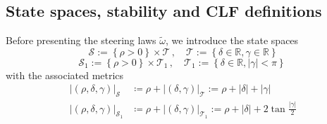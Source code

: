 \documentclass[letterpaper, 10 pt, conference]{ieeeconf}  %
\newcommand{\abs}[1]{\left\lvert#1\right\rvert}
\begin{document}
\subsection{State spaces, stability and CLF definitions}
Before presenting the steering laws $\tilde{\omega}$, we introduce the state spaces 
\begin{equation}
\mathcal{S} := 
\left\{ \rho> 0\right\}\times\mathcal{T}\,,\quad \mathcal{T}:= \left\{ \delta \in\mathbb{R}, \gamma \in\mathbb{R}  \right\} 
\label{eq:ss_S}
\end{equation}
\begin{equation}
    \mathcal{S}_1 := \left\{ \rho> 0\right\}\times\mathcal{T}_1\,,\quad \mathcal{T}_1:= \left\{  \delta \in  \mathbb{R}, \abs{\gamma} <  \pi \right\} \  \label{eq:ss_S1}
\end{equation}
 with the associated metrics
\begin{align}
|(\rho,\delta,\gamma)|_{\mathcal{S}}   &\coloneqq \rho+|(\delta,\gamma)|_{\mathcal{T}} 
      :=  \rho + |\delta| + |\gamma|  %
      \\
|(\rho,\delta,\gamma)|_{\mathcal{S}_1} &\coloneqq \rho+|(\delta,\gamma)|_{\mathcal{T}_1} 
      := \rho+ |\delta| + 2\tan\!\frac{|\gamma|}{2}   %
\end{align}
\end{document}

